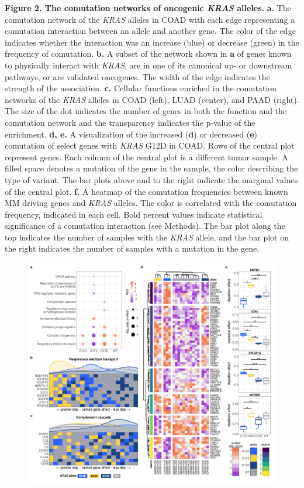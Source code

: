 \documentclass[english, 10pt, letterpaper]{article}
\newcommand{\KRAS}{\emph{KRAS}}
\begin{document}
\newpage
\noindent \textbf{Figure 2. The comutation networks of oncogenic \KRAS{} alleles.}
\textbf{a.} The comutation network of the \KRAS{} alleles in COAD with each edge representing a comutation interaction between an allele and another gene. The color of the edge indicates whether the interaction was an increase (blue) or decrease (green) in the frequency of comutation.
\textbf{b.} A subset of the network shown in \textbf{a} of genes known to physically interact with \KRAS{}, are in one of its canonical up- or downstream pathways, or are validated oncogenes. The width of the edge indicates the strength of the association.
\textbf{c.} Cellular functions enriched in the comutation networks of the \KRAS{} alleles in COAD (left), LUAD (center), and PAAD (right). The size of the dot indicates the number of genes in both the function and the comutation network and the transparency indicates the p-value of the enrichment.
\textbf{d, e.} A visualization of the increased (\textbf{d}) or decreased (\textbf{e}) comutation of select genes with \KRAS{} G12D in COAD. Rows of the central plot represent genes. Each column of the central plot is a different tumor sample. A filled space denotes a mutation of the gene in the sample, the color describing the type of variant. The bar plots above and to the right indicate the marginal values of the central plot.
\textbf{f.} A heatmap of the comutation frequencies between known MM driving genes and \KRAS{} alleles. The color is correlated with the comutation frequency, indicated in each cell. Bold percent values indicate statistical significance of a comutation interaction (see Methods). The bar plot along the top indicates the number of samples with the \KRAS{} allele, and the bar plot on the right indicates the number of samples with a mutation in the gene.
\newpage


\begin{figure}[h!]
\centering
\includegraphics[width=180mm]{figures/Fig_3.jpeg}
\label{fig:coad-dependency-main}
\end{figure}
\end{document}
